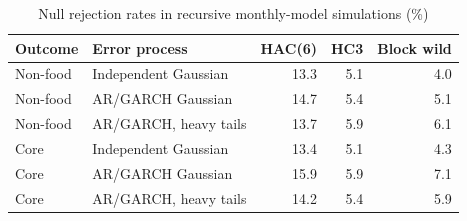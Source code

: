 \begin{table}[H]
\centering\small
\caption{Null rejection rates in recursive monthly-model simulations (\%)}
\label{tab:calibration}
\begin{tabularx}{\linewidth}{lXrrr}
\toprule
Outcome & Error process & HAC(6) & HC3 & Block wild\\
\midrule
Non-food & Independent Gaussian & 13.3 & 5.1 & 4.0\\
Non-food & AR/GARCH Gaussian & 14.7 & 5.4 & 5.1\\
Non-food & AR/GARCH, heavy tails & 13.7 & 5.9 & 6.1\\
Core & Independent Gaussian & 13.4 & 5.1 & 4.3\\
Core & AR/GARCH Gaussian & 15.9 & 5.9 & 7.1\\
Core & AR/GARCH, heavy tails & 14.2 & 5.4 & 5.9\\
\bottomrule
\end{tabularx}
\end{table}
